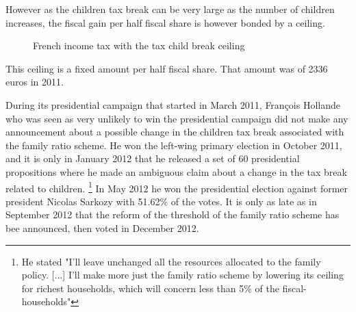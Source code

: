 \medskip

However as the children tax break can be very large as the number of children increases, the fiscal gain per half fiscal share is however bonded by a ceiling.
\medskip


\begin{figure}[H]
  \caption{French income tax with the tax child break ceiling }
  \label{fig:couple_couple_1_child_before_after}
%
\end{figure}














This ceiling is a fixed amount per half fiscal share. That amount was of 2336 euros in 2011. 

During its presidential campaign that started in March 2011, François Hollande who was seen as very unlikely to win the presidential campaign did not make any announcement about a possible change in the children tax break associated with the family ratio scheme. He won the left-wing primary election in October 2011, and it is only in January 2012 that he released a set of 60 presidential propositions where he made an ambiguous claim about a change in the tax break related to children.
\footnote{ He stated "I'll leave unchanged all the resources allocated to the family policy. [...] I'll make more just the family ratio scheme by lowering its ceiling for richest households, which will concern less than 5\% of the fiscal-households"}
In May 2012 he won the presidential election against former president Nicolas Sarkozy with 51.62\% of the votes. It is only as late as in September 2012 that the reform of the threshold of the family ratio scheme has bee announced, then voted in December 2012.

